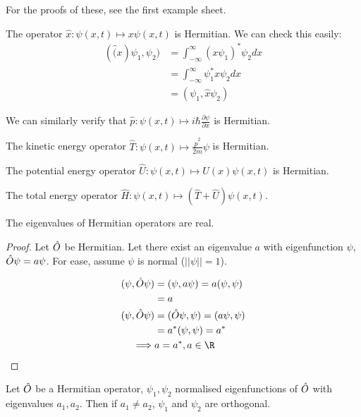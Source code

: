 \documentclass[../Main.tex]{subfiles}
\begin{document}
\begin{examples}{
        For the proofs of these, see the first example sheet.
    }
    \item The operator $\hat{x} : \psi(x, t) \mapsto x\psi(x, t)$ is Hermitian. We can check this easily:
        \begin{align*}
            (\hat(x)\psi_1, \psi_2) &= \int_{-\infty}^\infty (x\psi_1)^* \psi_2 dx \\
            &= \int_{-\infty}^\infty \psi_1^* x \psi_2 dx \\
            &= (\psi_1, \hat{x} \psi_2)
        \end{align*}
    \item We can similarly verify that $\hat{p} : \psi(x, t) \mapsto i\hbar \frac{\partial \psi}{\partial x}$ is Hermitian.
    \item The kinetic energy operator $\hat{T} : \psi(x, t) \mapsto \frac{\hat{p}^2}{2m}\psi$ is Hermitian.
    \item The potential energy operator $\hat{U} : \psi(x, t) \mapsto U(x) \psi(x,t)$ is Hermitian.
    \item The total energy operator $\hat{H} : \psi(x, t) \mapsto (\hat{T} + \hat{U}) \psi(x, t)$.
\end{examples}
\begin{theorem}
    The eigenvalues of Hermitian operators are real.
    \label{thmReaEvals}
\end{theorem}
\begin{proof}
    Let $\hat{O}$ be Hermitian. Let there exist an eigenvalue $a$ with eigenfunction $\psi$, $\hat{O} \psi = a\psi$. For ease, assume $\psi$ is normal ($||\psi|| = 1$).

    \begin{align*}
        (\psi, \op\psi) &= (\psi, a\psi) = a(\psi, \psi) \\
        &= a \\
        (\psi, \op\psi) &= (\op\psi, \psi) = (a\psi, \psi) \\
        &= a^* (\psi, \psi) = a^* \\
        \implies& a = a^*, a \in \R
    \end{align*}
\end{proof}
\begin{theorem}
    Let $\hat{O}$ be a Hermitian operator, $\psi_1, \psi_2$ normalised eigenfunctions of $\hat{O}$ with eigenvalues $a_1, a_2$. Then if $a_1 \neq a_2$, $\psi_1$ and $\psi_2$ are orthogonal.
    \label{thmOrthoEFuncs}
\end{theorem}
\end{document}
